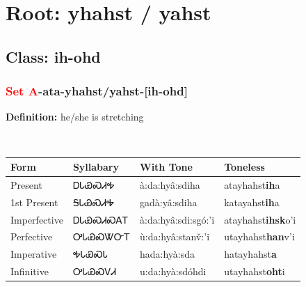 \needspace{4in}
\section*{Root: yhahst / yahst}
\nopagebreak
{}
\needspace{3in}
\subsection*{Class: ih-ohd}
\nopagebreak
\needspace{2in}
\subsubsection*{\textcolor{Red}{Set A}{-}ata{-}\textbf{yhahst/yahst}{-}[ih-ohd]}
\nopagebreak
\textbf{Definition: } he/she is stretching
\\[0.5em]
\begin{tabularx}{\textwidth}{l X X X}%
\toprule%
\textbf{Form}&\textbf{Syllabary}&\textbf{With Tone}&\textbf{Toneless}\\%
\midrule%
Present&ᎠᏓᏯᏍᏗᎭ&à:da:hyâ:sdiha&atayhahst\textbf{ih}a\\%
1st Present&ᎦᏓᏯᏍᏗᎭ&gadà:yâ:sdiha&katayahst\textbf{ih}a\\%
Imperfective&ᎠᏓᏯᏍᏗᏍᎪᎢ&à:da:hyâ:sdi:sgó:’i&atayhahst\textbf{ihsk}o'i\\%
Perfective&ᎤᏓᏯᏍᏔᏅᎢ&ù:da:hyâ:stanv̌:’i&utayhahst\textbf{han}v'i\\%
Imperative&ᎭᏓᏯᏍᏓ&hada:hyà:sda&hatayhahst\textbf{a}\\%
Infinitive&ᎤᏓᏯᏍᏙᏗ&u:da:hyà:sdóhdi&utayhahst\textbf{oht}i\\%
\bottomrule%
\end{tabularx}
\\[1em]